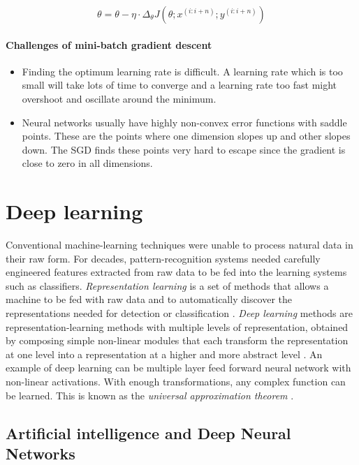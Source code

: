 \documentclass[a4paper, 12pt, oneside, BCOR1cm,toc=chapterentrywithdots]{scrbook}
\begin{document}
\begin{equation} \label{eqn:5}
\theta = \theta - \eta \cdot \Delta_{\theta} J(\theta; x^{(i:i+n)}; y^{(i:i+n)})
\end{equation}


\subsubsection{Challenges of mini-batch gradient descent}

\begin{itemize}
	\item Finding the optimum learning rate is difficult. A learning rate which is too small will take lots of time to converge and a learning rate too fast might overshoot and oscillate around the minimum.
	\item Neural networks usually have highly non-convex error functions with saddle points. These are the points where one dimension slopes up and other slopes down. The SGD finds these points very hard to escape since the gradient is close to zero in all dimensions.
\end{itemize}

\chapter{Deep learning}

Conventional machine-learning techniques were unable to process natural data in their raw form. For decades, pattern-recognition systems needed carefully engineered features extracted from raw data to be fed into the learning systems such as classifiers. \textit{Representation learning} is a set of methods that allows a machine to be fed with raw data and to automatically discover the representations needed for detection or classification \cite{lecun2015deep}. \textit{Deep learning} methods are representation-learning methods with multiple levels of representation, obtained by composing simple non-linear modules that each transform the representation at one level into a representation at a higher and more abstract level \cite{lecun2015deep}. An example of deep learning can be multiple layer feed forward neural network with non-linear activations. With enough transformations, any complex function can be learned.  This is known as the \textit{universal approximation theorem} \cite{csaji2001approximation}.


\section{Artificial intelligence and Deep Neural Networks}
\end{document}
